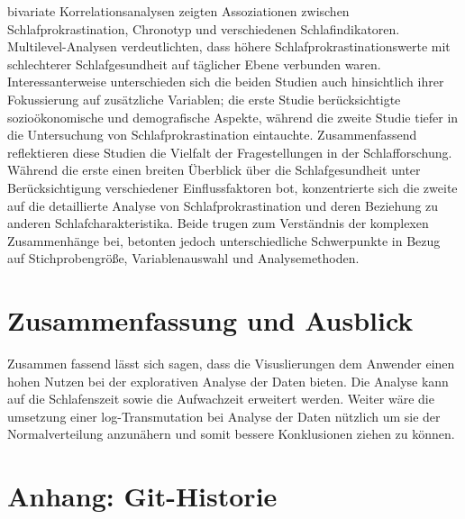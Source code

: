\documentclass[usegeometry=true]{scrartcl}
\begin{document}
 bivariate Korrelationsanalysen zeigten Assoziationen zwischen Schlafprokrastination, Chronotyp und verschiedenen Schlafindikatoren. 
 Multilevel-Analysen verdeutlichten, dass höhere Schlafprokrastinationswerte mit schlechterer Schlafgesundheit auf täglicher 
 Ebene verbunden waren. Interessanterweise unterschieden sich die beiden Studien auch hinsichtlich ihrer Fokussierung auf 
 zusätzliche Variablen; die erste Studie berücksichtigte sozioökonomische und demografische Aspekte, während die zweite Studie tiefer
  in die Untersuchung von Schlafprokrastination eintauchte.
\newline
Zusammenfassend reflektieren diese Studien die Vielfalt der Fragestellungen in der Schlafforschung. Während die erste einen breiten Überblick über die Schlafgesundheit unter Berücksichtigung verschiedener Einflussfaktoren bot, konzentrierte sich die zweite auf die detaillierte Analyse von Schlafprokrastination und deren Beziehung zu anderen Schlafcharakteristika. Beide trugen zum Verständnis der komplexen Zusammenhänge bei, betonten jedoch unterschiedliche Schwerpunkte in Bezug auf Stichprobengröße, Variablenauswahl und Analysemethoden.

\section{Zusammenfassung und Ausblick}
Zusammen fassend lässt sich sagen, dass die Visuslierungen dem Anwender einen hohen Nutzen bei der explorativen Analyse der Daten bieten.
Die Analyse  kann auf die Schlafenszeit sowie die Aufwachzeit erweitert werden. Weiter wäre die umsetzung einer log-Transmutation bei Analyse der Daten nützlich um sie der Normalverteilung anzunähern und somit  bessere Konklusionen ziehen zu können.

\section*{Anhang: Git-Historie}
\end{document}
